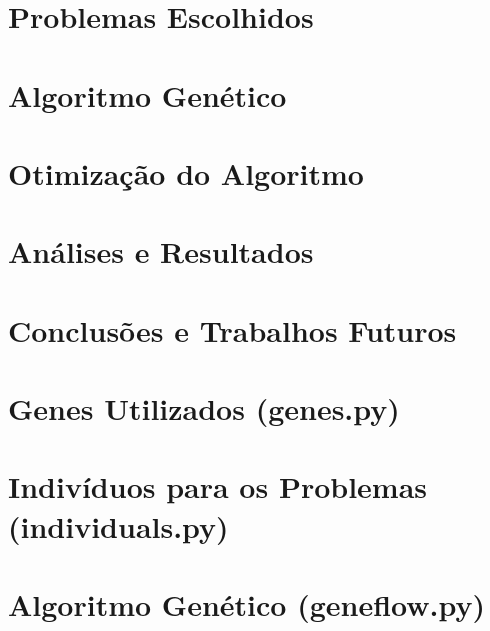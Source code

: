 \documentclass[12pt,plainheader,pnumplain]{abnt}
\newcommand{\oes}{\~oes }
\newcommand{\src}{src/experiments}
\begin{document}
\chapter{Problemas Escolhidos}


\chapter{Algoritmo Gen\'etico}


\chapter{Otimização do Algoritmo}


\chapter{An\'alises e Resultados}


\chapter{Conclus\oes e Trabalhos Futuros}





\appendix

\newpage
\chapter{Genes Utilizados (genes.py)}
\label{appendix:genes}


\newpage
\chapter{Indivíduos para os Problemas (individuals.py)}
\label{appendix:genes}


\newpage
\chapter{Algoritmo Genético (geneflow.py)}
\label{appendix:geneflow}



\end{document}
